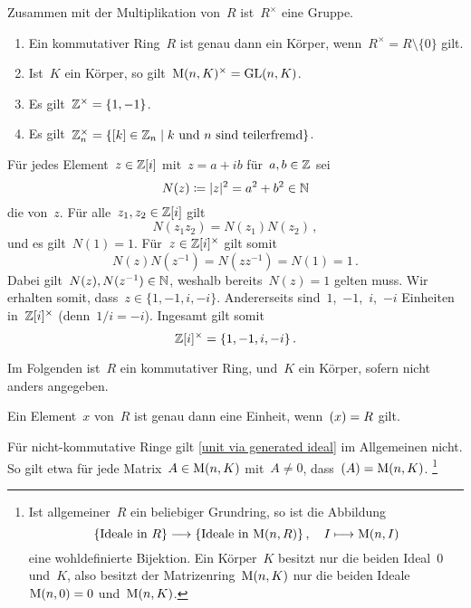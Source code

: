 \begin{proposition}
  Zusammen mit der Multiplikation von~$R$ ist~$R^\times$ eine Gruppe.
\end{proposition}

\begin{example}
  \leavevmode
  \begin{enumerate}
    \item
      Ein kommutativer Ring~$R$ ist genau dann ein Körper, wenn~$R^\times = R \setminus \{ 0 \}$ gilt.
    \item
      Ist~$K$ ein Körper, so gilt~$\operatorname{M}(n, K)^\times = \operatorname{GL}(n,K)$.
    \item
      Es gilt~$\mathbb{Z}^\times = \{1, -1\}$.
    \item
      Es gilt~$\Integer_n^\times = \{ \class{k} \in \Integer_n \suchthat \text{$k$ und~$n$ sind teilerfremd} \}$.
  \end{enumerate}
\end{example}

\begin{example}
  \label{units in gaussian integers}
  Für jedes Element~$z \in \mathbb{Z}[i]$ mit~$z = a + ib$ für~$a, b \in \mathbb{Z}$ sei
  \[
    N(z)
    \coloneqq
    \lvert z\rvert^2
    =
    a^2 + b^2
    \in \mathbb{N}
  \]
  die  von~$z$.
  Für alle~$z_1, z_2 \in \mathbb{Z}[i]$ gilt
  \[
    N(z_1 z_2)
    =
    N(z_1) N(z_2) \,,
  \]
  und es gilt~$N(1) = 1$.
  Für~$z \in \mathbb{Z}[i]^\times$ gilt somit
  \[
    N(z) N(z^{-1})
    =
    N(z z^{-1})
    =
    N(1)
    =
    1 \,.
  \]
  Dabei gilt~$N(z), N(z^{-1}) \in \mathbb{N}$, weshalb bereits~$N(z) = 1$ gelten muss.
  Wir erhalten somit, dass~$z \in \{1, -1, i, -i\}$.
  Andererseits sind~$1$,~$-1$,~$i$,~$-i$ Einheiten in~$\mathbb{Z}[i]^\times$ (denn~$1/i = -i$).
  Ingesamt gilt somit
  \[
    \mathbb{Z}[i]^\times
    =
    \{ 1, -1, i, -i \} \,.
  \]
\end{example}

\begin{convention}
  Im Folgenden ist~$R$ ein kommutativer Ring, und~$K$ ein Körper, sofern nicht anders angegeben. 
\end{convention}

\begin{proposition}
  \label{unit via generated ideal}
  Ein Element~$x$ von~$R$ ist genau dann eine Einheit, wenn~$(x) = R$ gilt.
\end{proposition}

\begin{warning}
  Für nicht-kommutative Ringe gilt \cref{unit via generated ideal} im Allgemeinen nicht.
  So gilt etwa für jede Matrix~$A \in \operatorname{M}(n,K)$ mit~$A \neq 0$, dass~$(A) = \operatorname{M}(n,K)$.%
  \footnote{
    Ist allgemeiner~$R$ ein beliebiger Grundring, so ist die Abbildung
    \[
      \{ \text{Ideale in~$R$} \}
      \to
      \{ \text{Ideale in~$\Mat(n,R)$} \} \,,
      \quad
      I
      \mapsto
      \Mat(n,I)
    \]
    eine wohldefinierte Bijektion.
    Ein Körper~$K$ besitzt nur die beiden Ideal~$0$ und~$K$, also besitzt der Matrizenring~$\operatorname{M}(n,K)$ nur die beiden Ideale~$\operatorname{M}(n,0) = 0$ und~$\operatorname{M}(n,K)$.
  }
\end{warning}


